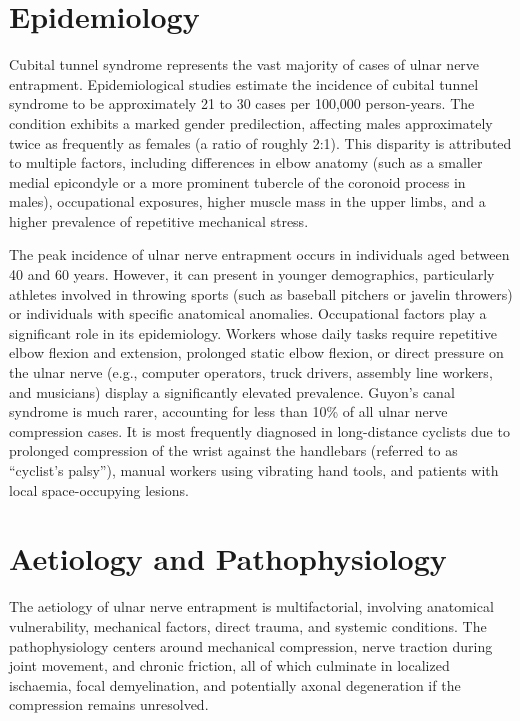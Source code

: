 \section*{Epidemiology}
Cubital tunnel syndrome represents the vast majority of cases of ulnar nerve entrapment. Epidemiological studies estimate the incidence of cubital tunnel syndrome to be approximately 21 to 30 cases per 100,000 person-years. The condition exhibits a marked gender predilection, affecting males approximately twice as frequently as females (a ratio of roughly 2:1). This disparity is attributed to multiple factors, including differences in elbow anatomy (such as a smaller medial epicondyle or a more prominent tubercle of the coronoid process in males), occupational exposures, higher muscle mass in the upper limbs, and a higher prevalence of repetitive mechanical stress.

The peak incidence of ulnar nerve entrapment occurs in individuals aged between 40 and 60 years. However, it can present in younger demographics, particularly athletes involved in throwing sports (such as baseball pitchers or javelin throwers) or individuals with specific anatomical anomalies. Occupational factors play a significant role in its epidemiology. Workers whose daily tasks require repetitive elbow flexion and extension, prolonged static elbow flexion, or direct pressure on the ulnar nerve (e.g., computer operators, truck drivers, assembly line workers, and musicians) display a significantly elevated prevalence. Guyon's canal syndrome is much rarer, accounting for less than 10\% of all ulnar nerve compression cases. It is most frequently diagnosed in long-distance cyclists due to prolonged compression of the wrist against the handlebars (referred to as ``cyclist's palsy''), manual workers using vibrating hand tools, and patients with local space-occupying lesions.

\section*{Aetiology and Pathophysiology}
The aetiology of ulnar nerve entrapment is multifactorial, involving anatomical vulnerability, mechanical factors, direct trauma, and systemic conditions. The pathophysiology centers around mechanical compression, nerve traction during joint movement, and chronic friction, all of which culminate in localized ischaemia, focal demyelination, and potentially axonal degeneration if the compression remains unresolved.

